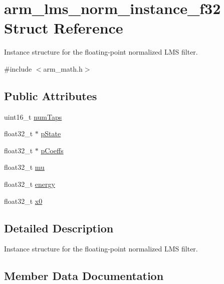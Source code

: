 \hypertarget{structarm__lms__norm__instance__f32}{}\section{arm\+\_\+lms\+\_\+norm\+\_\+instance\+\_\+f32 Struct Reference}
\label{structarm__lms__norm__instance__f32}


Instance structure for the floating-\/point normalized L\+MS filter.  




{\ttfamily \#include $<$arm\+\_\+math.\+h$>$}

\subsection*{Public Attributes}
\begin{DoxyCompactItemize}
\item 
uint16\+\_\+t \hyperlink{structarm__lms__norm__instance__f32_ac95f8ca3d816524c2070643852fac5e8}{num\+Taps}
\item 
float32\+\_\+t $\ast$ \hyperlink{structarm__lms__norm__instance__f32_a0bc03338687002ed5f2e4a363eb095ec}{p\+State}
\item 
float32\+\_\+t $\ast$ \hyperlink{structarm__lms__norm__instance__f32_a1ba688d90aba7de003ed4ad8e2e7ddda}{p\+Coeffs}
\item 
float32\+\_\+t \hyperlink{structarm__lms__norm__instance__f32_a84401d3cfc6c40f69c08223cf341b886}{mu}
\item 
float32\+\_\+t \hyperlink{structarm__lms__norm__instance__f32_a6a4119e4f39447bbee31b066deafa16f}{energy}
\item 
float32\+\_\+t \hyperlink{structarm__lms__norm__instance__f32_aec958fe89b164a30f38bcca9f5d96218}{x0}
\end{DoxyCompactItemize}


\subsection{Detailed Description}
Instance structure for the floating-\/point normalized L\+MS filter. 

\subsection{Member Data Documentation}
